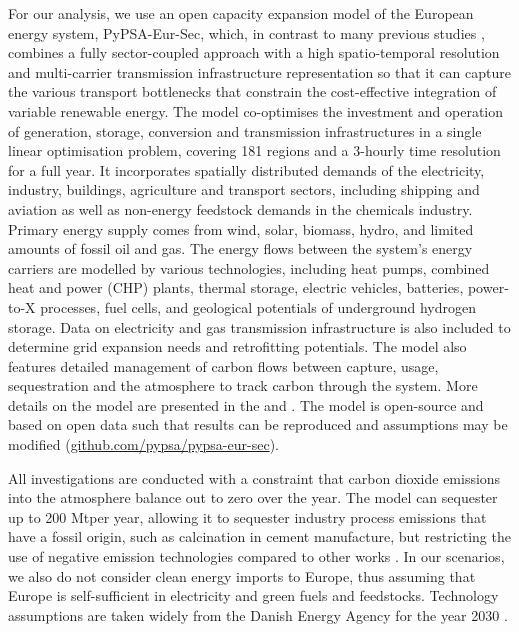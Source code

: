 For our analysis, we use an open capacity expansion model of the European energy
system, PyPSA-Eur-Sec, which, in contrast to many previous studies
\cite{henningComprehensiveModel2014,mathiesenSmartEnergy2015,connollySmartEnergy2016,lofflerDesigningModel2017,blancoPotentialHydrogen2018,brownSynergiesSector2018,in-depth_2018,victoria2020},
combines a fully sector-coupled approach with a high spatio-temporal resolution
and multi-carrier transmission infrastructure representation so that it can
capture the various transport bottlenecks that constrain the cost-effective
integration of variable renewable energy. The model co-optimises the investment
and operation of generation, storage, conversion and transmission
infrastructures in a single linear optimisation problem, covering 181 regions
and a 3-hourly time resolution for a full year. It incorporates spatially
distributed demands of the electricity, industry, buildings, agriculture and
transport sectors, including shipping and aviation as well as non-energy
feedstock demands in the chemicals industry. Primary energy supply comes from
wind, solar, biomass, hydro, and limited amounts of fossil oil and gas. The
energy flows between the system's energy carriers are modelled by various
technologies, including heat pumps, combined heat and power (CHP) plants,
thermal storage, electric vehicles, batteries, power-to-X processes, fuel cells,
and geological potentials of underground hydrogen storage. Data on electricity
and gas transmission infrastructure is also included to determine grid expansion
needs and retrofitting potentials. The model also features detailed management
of carbon flows between capture, usage, sequestration and the atmosphere to
track carbon through the system. More details on the model are presented in the
 and . The model is open-source and based
on open data such that results can be reproduced and assumptions may be modified
(\href{https://github.com/pypsa/pypsa-eur-sec}{github.com/pypsa/pypsa-eur-sec}).

All investigations are conducted with a constraint that carbon dioxide emissions
into the atmosphere balance out to zero over the year. The model can sequester
up to 200 Mt\co per year, allowing it to sequester industry process emissions that have a fossil origin,
such as calcination in cement manufacture, but restricting
the use of negative emission technologies compared to other works
\cite{blancoPotentialHydrogen2018}. In our scenarios, we also do not consider
clean energy imports to Europe, thus assuming that Europe is self-sufficient in
electricity and green fuels and feedstocks. Technology assumptions are taken
widely from the Danish Energy Agency for the year 2030 \cite{DEA}.

